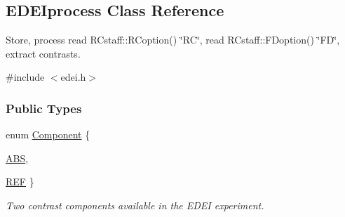 \hypertarget{classEDEIprocess}{
\subsection{EDEIprocess Class Reference}
\label{classEDEIprocess}
}


Store, process read RCstaff::RCoption() \char`\"{}RC\char`\"{}, read RCstaff::FDoption() \char`\"{}FD\char`\"{}, extract contrasts.  




{\ttfamily \#include $<$edei.h$>$}

\subsubsection*{Public Types}
\begin{DoxyCompactItemize}
\item 
enum \hyperlink{classEDEIprocess_a745d55d7f97f3aafa52998d49d9acde4}{Component} \{ \par
\hyperlink{classEDEIprocess_a745d55d7f97f3aafa52998d49d9acde4a0ca15c00e66cb8d8eb71439dfad57bae}{ABS}, 
\par
\hyperlink{classEDEIprocess_a745d55d7f97f3aafa52998d49d9acde4ab2db81707708c7fc95573b0ec104ae9f}{REF}
 \}
\begin{DoxyCompactList}\small\item\em Two contrast components available in the EDEI experiment. \item\end{DoxyCompactList}\end{DoxyCompactItemize}
